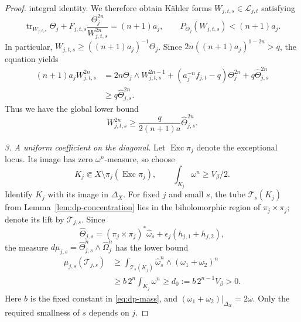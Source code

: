 \documentclass[reqno]{amsart}
\numberwithin{equation}{section}
\theoremstyle{definition}
\DeclareMathOperator{\tr}{tr}
\begin{document}
\begin{proof}
integral identity. We therefore obtain K\"ahler forms
$W_{j,t,s}\in\mathcal L_{j,t}$ satisfying
\begin{equation}\label{eq:product-equation}
 \tr_{W_{j,t,s}}\Theta_j
   +F_{j,t,s}\frac{\Theta_j^{2n}}{W_{j,t,s}^{2n}}=(n+1)a_j,
 \qquad
 P_{\Theta_j}(W_{j,t,s})<(n+1)a_j.
\end{equation}
In particular, $W_{j,t,s}\ge((n+1)a_j)^{-1}\Theta_j$.
Since $2n((n+1)a_j)^{1-2n}>q$, the equation yields
\[
 \begin{aligned}
 (n+1)a_jW_{j,t,s}^{2n}
 &=2n\Theta_j\wedge W_{j,t,s}^{2n-1}
       +(a_j^{-n}f_{j,t}-q)\Theta_j^{2n}
       +q\widehat\Theta_{j,s}^{2n}\\
 &\ge q\widehat\Theta_{j,s}^{2n}.
 \end{aligned}
\]
Thus we have the global lower bound
\begin{equation}\label{eq:product-determinant}
 W_{j,t,s}^{2n}\ge
       \frac{q}{2(n+1)a}\widehat\Theta_{j,s}^{2n}.
\end{equation}

\smallskip\noindent
\emph{3. A uniform coefficient on the diagonal.}
Let $\operatorname{Exc}\pi_j$ denote the exceptional locus.
Its image has zero $\omega^n$-measure, so choose
\[
 K_j\Subset X\setminus\pi_j(\operatorname{Exc}\pi_j),
 \qquad \int_{K_j}\omega^n\ge V_\beta/2.
\]
Identify $K_j$ with its image in $\Delta_X$.
For fixed $j$ and small $s$, the tube $\mathcal T_s(K_j)$ from
Lemma~\ref{lem:dp-concentration} lies in the
biholomorphic region of $\pi_j\times\pi_j$; denote its lift by
$\mathcal T_{j,s}$.
Since
\[
 \widehat\Theta_{j,s}
 =(\pi_j\times\pi_j)^*\widehat\omega_s
       +\epsilon_j(h_{j,1}+h_{j,2}),
\]
the measure $d\mu_{j,s}=\widehat\Theta_{j,s}^n\wedge\widehat\Omega_j^n$
has the lower bound
\begin{equation}\label{eq:tube-mass}
 \begin{aligned}
 \mu_{j,s}(\mathcal T_{j,s})
 &\ge\int_{\mathcal T_s(K_j)}
                 \widehat\omega_s^n\wedge(\omega_1+\omega_2)^n\\
 &\ge b\,2^n\int_{K_j}\omega^n
       \ge d_0:=b\,2^{n-1}V_\beta>0.
 \end{aligned}
\end{equation}
Here $b$ is the fixed constant in
\eqref{eq:dp-mass}, and
$(\omega_1+\omega_2)|_{\Delta_X}=2\omega$.
Only the required smallness of $s$ depends on $j$.


\end{proof}
\end{document}
